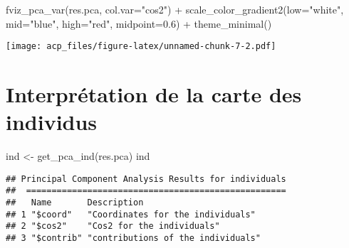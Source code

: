 \documentclass[
]{article}
\newenvironment{Shaded}{\begin{snugshade}}{\end{snugshade}}
\newcommand{\AttributeTok}[1]{\textcolor[rgb]{0.77,0.63,0.00}{#1}}
\newcommand{\FloatTok}[1]{\textcolor[rgb]{0.00,0.00,0.81}{#1}}
\newcommand{\FunctionTok}[1]{\textcolor[rgb]{0.00,0.00,0.00}{#1}}
\newcommand{\NormalTok}[1]{#1}
\newcommand{\OtherTok}[1]{\textcolor[rgb]{0.56,0.35,0.01}{#1}}
\newcommand{\SpecialCharTok}[1]{\textcolor[rgb]{0.00,0.00,0.00}{#1}}
\newcommand{\StringTok}[1]{\textcolor[rgb]{0.31,0.60,0.02}{#1}}
\begin{document}
\begin{Shaded}
\begin{Highlighting}[]
\FunctionTok{fviz\_pca\_var}\NormalTok{(res.pca, }\AttributeTok{col.var=}\StringTok{"cos2"}\NormalTok{) }\SpecialCharTok{+}
  \FunctionTok{scale\_color\_gradient2}\NormalTok{(}\AttributeTok{low=}\StringTok{"white"}\NormalTok{, }\AttributeTok{mid=}\StringTok{"blue"}\NormalTok{, }
                        \AttributeTok{high=}\StringTok{"red"}\NormalTok{, }\AttributeTok{midpoint=}\FloatTok{0.6}\NormalTok{) }\SpecialCharTok{+} 
  \FunctionTok{theme\_minimal}\NormalTok{()}
\end{Highlighting}
\end{Shaded}

\texttt{[image: acp\_files/figure-latex/unnamed-chunk-7-2.pdf]}

\hypertarget{interpruxe9tation-de-la-carte-des-individus}{%
\section{Interprétation de la carte des
individus}\label{interpruxe9tation-de-la-carte-des-individus}}

\begin{Shaded}
\begin{Highlighting}[]
\NormalTok{ind }\OtherTok{\textless{}{-}} \FunctionTok{get\_pca\_ind}\NormalTok{(res.pca)}
\NormalTok{ind}
\end{Highlighting}
\end{Shaded}

\begin{verbatim}
## Principal Component Analysis Results for individuals
##  ===================================================
##   Name       Description                       
## 1 "$coord"   "Coordinates for the individuals" 
## 2 "$cos2"    "Cos2 for the individuals"        
## 3 "$contrib" "contributions of the individuals"
\end{verbatim}

\begin{Shaded}
\end{Shaded}
\end{document}
